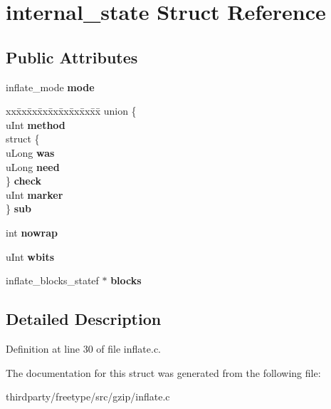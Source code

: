 \hypertarget{structinternal__state}{}\section{internal\+\_\+state Struct Reference}
\label{structinternal__state}
\subsection*{Public Attributes}
\begin{DoxyCompactItemize}
\item 
\mbox{\label{structinternal__state_ac9ea84c48c0df8c7b6ceb51aa38e6c72}} 
inflate\+\_\+mode {\bfseries mode}
\item 
\mbox{\label{structinternal__state_a0b1e68cbc49659fb9565217618ed84cf}} 
\begin{tabbing}
xx\=xx\=xx\=xx\=xx\=xx\=xx\=xx\=xx\=\kill
union \{\\
\>uInt {\bfseries method}\\
\>struct \{\\
\>\>uLong {\bfseries was}\\
\>\>uLong {\bfseries need}\\
\>\} {\bfseries check}\\
\>uInt {\bfseries marker}\\
\} {\bfseries sub}\\

\end{tabbing}\item 
\mbox{\label{structinternal__state_a94b0457804224cbab3e27e2cc672d2d6}} 
int {\bfseries nowrap}
\item 
\mbox{\label{structinternal__state_a6f907cec76d062bd4b48a58775fc131c}} 
u\+Int {\bfseries wbits}
\item 
\mbox{\label{structinternal__state_a874dae29457736e2b5dc6d8834642caa}} 
inflate\+\_\+blocks\+\_\+statef $\ast$ {\bfseries blocks}
\end{DoxyCompactItemize}


\subsection{Detailed Description}


Definition at line 30 of file inflate.\+c.



The documentation for this struct was generated from the following file\+:\begin{DoxyCompactItemize}
\item 
thirdparty/freetype/src/gzip/inflate.\+c\end{DoxyCompactItemize}
